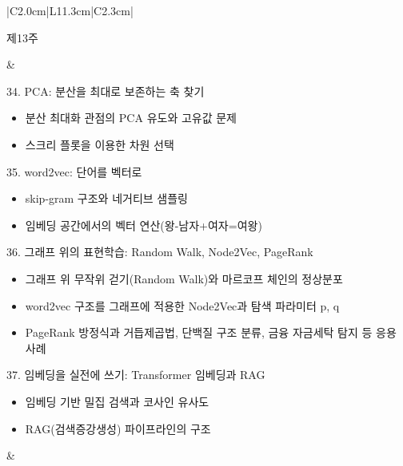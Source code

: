 \documentclass[11pt,a4paper]{article}
\begin{document}
\begin{longtable}{|C{2.0cm}|L{11.3cm}|C{2.3cm}|}
\begin{minipage}[t]{1.8cm}\centering 제13주\\[2mm]\hspace*{0mm}\end{minipage} & \begin{minipage}[t]{11.0cm}
34. PCA: 분산을 최대로 보존하는 축 찾기\\
\vspace{-1mm}\begin{itemize}[leftmargin=5mm,itemsep=0.2mm,topsep=0.5mm,parsep=0pt]
\item\small 분산 최대화 관점의 PCA 유도와 고유값 문제
\item\small 스크리 플롯을 이용한 차원 선택
\end{itemize}
\vspace{1mm}
35. word2vec: 단어를 벡터로\\
\vspace{-1mm}\begin{itemize}[leftmargin=5mm,itemsep=0.2mm,topsep=0.5mm,parsep=0pt]
\item\small skip-gram 구조와 네거티브 샘플링
\item\small 임베딩 공간에서의 벡터 연산(왕-남자+여자=여왕)
\end{itemize}
\vspace{1mm}
36. 그래프 위의 표현학습: Random Walk, Node2Vec, PageRank\\
\vspace{-1mm}\begin{itemize}[leftmargin=5mm,itemsep=0.2mm,topsep=0.5mm,parsep=0pt]
\item\small 그래프 위 무작위 걷기(Random Walk)와 마르코프 체인의 정상분포
\item\small word2vec 구조를 그래프에 적용한 Node2Vec과 탐색 파라미터 p, q
\item\small PageRank 방정식과 거듭제곱법, 단백질 구조 분류, 금융 자금세탁 탐지 등 응용 사례
\end{itemize}
\vspace{1mm}
37. 임베딩을 실전에 쓰기: Transformer 임베딩과 RAG\\
\vspace{-1mm}\begin{itemize}[leftmargin=5mm,itemsep=0.2mm,topsep=0.5mm,parsep=0pt]
\item\small 임베딩 기반 밀집 검색과 코사인 유사도
\item\small RAG(검색증강생성) 파이프라인의 구조
\end{itemize}
\vspace{1mm}
\end{minipage} & \begin{minipage}[t]{2.1cm}\centering \end{minipage} \\


\end{longtable}
\end{document}
